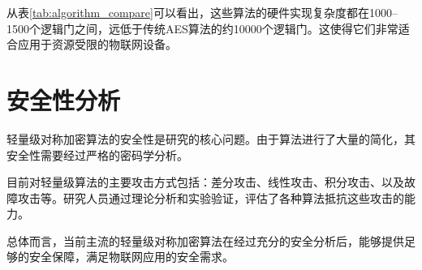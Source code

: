 从表\ref{tab:algorithm_compare}可以看出，这些算法的硬件实现复杂度都在1000--1500个逻辑门之间，远低于传统AES算法的约10000个逻辑门。这使得它们非常适合应用于资源受限的物联网设备。

\section{安全性分析}

轻量级对称加密算法的安全性是研究的核心问题。由于算法进行了大量的简化，其安全性需要经过严格的密码学分析。

目前对轻量级算法的主要攻击方式包括：差分攻击、线性攻击、积分攻击、以及故障攻击等。研究人员通过理论分析和实验验证，评估了各种算法抵抗这些攻击的能力。

总体而言，当前主流的轻量级对称加密算法在经过充分的安全分析后，能够提供足够的安全保障，满足物联网应用的安全需求。
